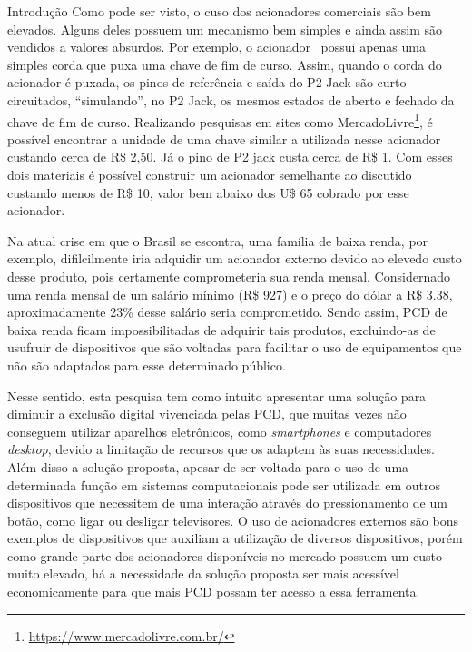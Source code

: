 \begin{chapter}{Introdução}
Como pode ser visto, o cuso dos acionadores comerciais são bem elevados. Alguns
deles possuem um mecanismo bem simples e ainda assim são vendidos a valores
absurdos. Por exemplo, o acionador~\cite{StringSwitch} possui apenas uma simples
corda que puxa uma chave de fim de curso. Assim, quando o corda do acionador é
puxada, os pinos de referência e saída do P2 Jack são curto-circuitados,
``simulando'', no P2 Jack, os mesmos estados de aberto e fechado da chave de fim
de curso. Realizando pesquisas em sites como
MercadoLivre\footnote{\url{https://www.mercadolivre.com.br/}}, é possível
encontrar a unidade de uma chave similar a utilizada nesse acionador custando
cerca de R\$ 2,50. Já o pino de P2 jack custa cerca de R\$ 1. Com esses dois
materiais é possível construir um acionador semelhante ao discutido custando
menos de R\$ 10, valor bem abaixo dos U\$ 65 cobrado por esse acionador. %

Na atual crise em que o Brasil se escontra, uma família de baixa renda, por
exemplo, difilcilmente iria adquidir um acionador externo devido ao elevedo
custo desse produto, pois certamente comprometeria sua renda mensal.
Considernado uma renda mensal de um salário mínimo  (R\$ 927) e o preço do dólar
a R\$ 3.38, aproximadamente 23\% desse salário seria comprometido. Sendo assim,
PCD de baixa renda ficam impossibilitadas de adquirir tais produtos,
excluindo-as de usufruir de dispositivos que são voltadas para facilitar o uso
de equipamentos que não são adaptados para esse determinado público. %

Nesse sentido, esta pesquisa tem como intuito apresentar uma solução para
diminuir a exclusão digital vivenciada pelas PCD, que muitas vezes não conseguem
utilizar aparelhos eletrônicos, como \textit{smartphones} e computadores
\textit{desktop}, devido a limitação de recursos que os adaptem às suas
necessidades. Além disso a solução proposta, apesar de ser voltada para o uso de
uma determinada função em sistemas computacionais pode ser
utilizada em outros dispositivos que necessitem de uma interação através do
pressionamento de um botão, como ligar ou desligar televisores. O uso de
acionadores externos são bons exemplos de dispositivos que auxiliam a utilização
de diversos dispositivos, porém como grande parte dos acionadores disponíveis no
mercado possuem um custo muito elevado, há a necessidade da solução proposta ser
mais acessível economicamente para que mais PCD possam ter acesso a essa
ferramenta. 

 

\end{chapter}
